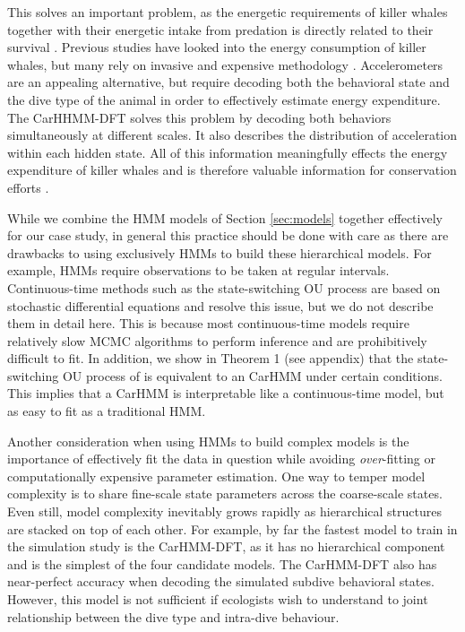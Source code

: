 This solves an important problem, as the energetic requirements of killer whales together with their energetic intake from predation is directly related to their survival \citep{Williams:2009,Noren:2011}. Previous studies have looked into the energy consumption of killer whales, but many rely on invasive and expensive methodology \citep{Williams:2009,Noren:2011}. Accelerometers are an appealing alternative, but require decoding both the behavioral state \citep{Dot:2016} and the dive type \citep{Hastie:2006} of the animal in order to effectively estimate energy expenditure. The CarHHMM-DFT solves this problem by decoding both behaviors simultaneously at different scales. It also describes the distribution of acceleration within each hidden state. All of this information meaningfully effects the energy expenditure of killer whales and is therefore valuable information for conservation efforts \citep{Williams:2009,Noren:2011}.

While we combine the HMM models of Section \ref{sec:models} together effectively for our case study, in general this practice should be done with care as there are drawbacks to using exclusively HMMs to build these hierarchical models. For example, HMMs require observations to be taken at regular intervals. Continuous-time methods such as the state-switching OU process \citep{Michelot:2019} are based on stochastic differential equations and resolve this issue, but we do not describe them in detail here. This is because most continuous-time models require relatively slow MCMC algorithms to perform inference and are prohibitively difficult to fit. In addition, we show in Theorem 1 (see appendix) that the state-switching OU process of \citet{Michelot:2019} is equivalent to an CarHMM under certain conditions. This implies that a CarHMM is interpretable like a continuous-time model, but as easy to fit as a traditional HMM.

Another consideration when using HMMs to build complex models is the importance of effectively fit the data in question while avoiding \textit{over}-fitting or computationally expensive parameter estimation. One way to temper model complexity is to share fine-scale state parameters across the coarse-scale states. Even still, model complexity inevitably grows rapidly as hierarchical structures are stacked on top of each other. For example, by far the fastest model to train in the simulation study is the CarHMM-DFT, as it has no hierarchical component and is the simplest of the four candidate models. The CarHMM-DFT also has near-perfect accuracy when decoding the simulated subdive behavioral states. However, this model is not sufficient if ecologists wish to understand to joint relationship between the dive type and intra-dive behaviour. 

